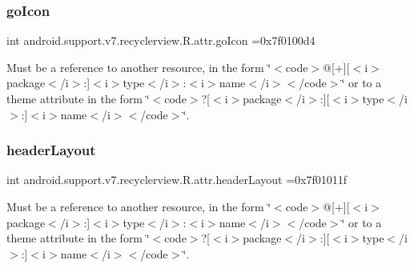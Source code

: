 \subsubsection{\texorpdfstring{go\+Icon}{goIcon}}
{\footnotesize\ttfamily int android.\+support.\+v7.\+recyclerview.\+R.\+attr.\+go\+Icon =0x7f0100d4\hspace{0.3cm}{\ttfamily [static]}}

Must be a reference to another resource, in the form \char`\"{}$<$code$>$@\mbox{[}+\mbox{]}\mbox{[}$<$i$>$package$<$/i$>$\+:\mbox{]}$<$i$>$type$<$/i$>$\+:$<$i$>$name$<$/i$>$$<$/code$>$\char`\"{} or to a theme attribute in the form \char`\"{}$<$code$>$?\mbox{[}$<$i$>$package$<$/i$>$\+:\mbox{]}\mbox{[}$<$i$>$type$<$/i$>$\+:\mbox{]}$<$i$>$name$<$/i$>$$<$/code$>$\char`\"{}. \mbox{\label{classandroid_1_1support_1_1v7_1_1recyclerview_1_1R_1_1attr_ab91ff4ac242d2ee5d47a6fccdb8ba6c3}} 
\subsubsection{\texorpdfstring{header\+Layout}{headerLayout}}
{\footnotesize\ttfamily int android.\+support.\+v7.\+recyclerview.\+R.\+attr.\+header\+Layout =0x7f01011f\hspace{0.3cm}{\ttfamily [static]}}

Must be a reference to another resource, in the form \char`\"{}$<$code$>$@\mbox{[}+\mbox{]}\mbox{[}$<$i$>$package$<$/i$>$\+:\mbox{]}$<$i$>$type$<$/i$>$\+:$<$i$>$name$<$/i$>$$<$/code$>$\char`\"{} or to a theme attribute in the form \char`\"{}$<$code$>$?\mbox{[}$<$i$>$package$<$/i$>$\+:\mbox{]}\mbox{[}$<$i$>$type$<$/i$>$\+:\mbox{]}$<$i$>$name$<$/i$>$$<$/code$>$\char`\"{}. \mbox{\label{classandroid_1_1support_1_1v7_1_1recyclerview_1_1R_1_1attr_a0f72397f7c76eaf2f42dc1ba30c839cc}} 
